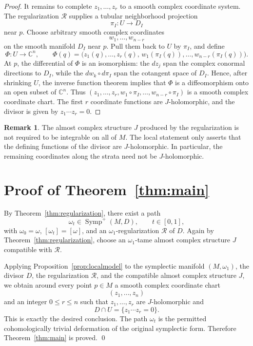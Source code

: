 \documentclass[11pt]{article}
\theoremstyle{definition}
\newtheorem{remark}[theorem]{Remark}
\begin{document}
\begin{proof}
It remains to complete \(z_1,\dots,z_r\) to a smooth complex coordinate system.  The regularization \(\mathcal R\) supplies a tubular neighborhood projection
\[
\pi_I:U\longrightarrow D_I
\]
near \(p\).  Choose arbitrary smooth complex coordinates
\[
w_1,\dots,w_{n-r}
\]
on the smooth manifold \(D_I\) near \(p\).  Pull them back to \(U\) by \(\pi_I\), and define
\[
\Phi:U\longrightarrow \mathbb C^n,\qquad
\Phi(q)=\bigl(z_1(q),\dots,z_r(q),\, w_1(\pi_I(q)),\dots,w_{n-r}(\pi_I(q))\bigr).
\]
At \(p\), the differential of \(\Phi\) is an isomorphism: the \(dz_j\) span the complex conormal directions to \(D_I\), while the \(dw_k\circ d\pi_I\) span the cotangent space of \(D_I\).  Hence, after shrinking \(U\), the inverse function theorem implies that \(\Phi\) is a diffeomorphism onto an open subset of \(\mathbb C^n\).  Thus \((z_1,\dots,z_r,w_1\circ\pi_I,\dots,w_{n-r}\circ\pi_I)\) is a smooth complex coordinate chart.  The first \(r\) coordinate functions are \(J\)-holomorphic, and the divisor is given by \(z_1\cdots z_r=0\).
\end{proof}

\begin{remark}
The almost complex structure \(J\) produced by the regularization is not required to be integrable on all of \(M\).  The local statement only asserts that the defining functions of the divisor are \(J\)-holomorphic.  In particular, the remaining coordinates along the strata need not be \(J\)-holomorphic.
\end{remark}

\section{Proof of Theorem~\ref{thm:main}}\label{sec:proof}

By Theorem~\ref{thm:regularization}, there exist a path
\[
\omega_t\in\operatorname{Symp}^+(M,D),\qquad t\in[0,1],
\]
with \(\omega_0=\omega\), \([\omega_t]=[\omega]\), and an \(\omega_1\)-regularization \(\mathcal R\) of \(D\).  Again by Theorem~\ref{thm:regularization}, choose an \(\omega_1\)-tame almost complex structure \(J\) compatible with \(\mathcal R\).

Applying Proposition~\ref{prop:localmodel} to the symplectic manifold \((M,\omega_1)\), the divisor \(D\), the regularization \(\mathcal R\), and the compatible almost complex structure \(J\), we obtain around every point \(p\in M\) a smooth complex coordinate chart
\[
(z_1,\dots,z_n)
\]
and an integer \(0\le r\le n\) such that \(z_1,\dots,z_r\) are \(J\)-holomorphic and
\[
D\cap U=\{z_1\cdots z_r=0\}.
\]
This is exactly the desired conclusion.  The path \(\omega_t\) is the permitted cohomologically trivial deformation of the original symplectic form.  Therefore Theorem~\ref{thm:main} is proved.
\qed
\end{document}
